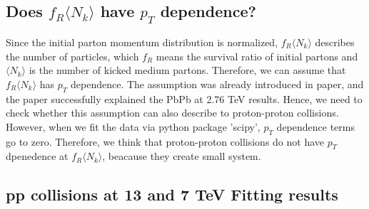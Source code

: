 \documentclass[jkps,fleqn,showpacs,showkeys]{revtex4}
\begin{document}
\subsection{Does $f_R\langle N_k \rangle$ have $p_T$ dependence?}
\label{subsec: pT depnedence}

Since the initial parton momentum distribution is normalized, $f_R\langle N_k \rangle$ describes the number of particles, which $f_R$ means the survival ratio of initial partons and $\langle N_k \rangle$ is the number of kicked medium partons.
Therefore, we can assume that $f_R\langle N_k \rangle$ has $p_T$ dependence.
The assumption was already introduced in paper\cite{PbPb}, and the paper successfully explained the PbPb at 2.76 TeV results.
Hence, we need to check whether this assumption can also describe to proton-proton collisions.
However, when we fit the data via python package 'scipy', $p_T$ dependence terms go to zero.
Therefore, we think that proton-proton collisions do not have $p_T$ dpenedence at $f_R\langle N_k \rangle$, beacause they create small system.




\subsection{pp collisions at 13 and 7 TeV Fitting results}
\label{subsec: pp collisions Fitting results}
\end{document}
